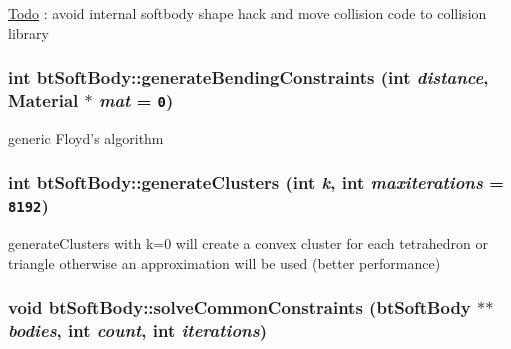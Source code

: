 \begin{Desc}
\item[\hyperlink{todo__todo000039}{Todo}]: avoid internal softbody shape hack and move collision code to collision library \end{Desc}
\hypertarget{classbt_soft_body_f31b03f0ff5eecec1ec9eee5a7582d20}{
\subsubsection[generateBendingConstraints]{\setlength{\rightskip}{0pt plus 5cm}int btSoftBody::generateBendingConstraints (int {\em distance}, \/  Material $\ast$ {\em mat} = {\tt 0})}}
\label{classbt_soft_body_f31b03f0ff5eecec1ec9eee5a7582d20}




generic Floyd's algorithm \hypertarget{classbt_soft_body_9915ca0d99dbeb9f39221dab218d5208}{
\subsubsection[generateClusters]{\setlength{\rightskip}{0pt plus 5cm}int btSoftBody::generateClusters (int {\em k}, \/  int {\em maxiterations} = {\tt 8192})}}
\label{classbt_soft_body_9915ca0d99dbeb9f39221dab218d5208}


generateClusters with k=0 will create a convex cluster for each tetrahedron or triangle otherwise an approximation will be used (better performance) \hypertarget{classbt_soft_body_e8a2fc459b2afc985fbb03c1b0203bec}{
\subsubsection[solveCommonConstraints]{\setlength{\rightskip}{0pt plus 5cm}void btSoftBody::solveCommonConstraints ({\bf btSoftBody} $\ast$$\ast$ {\em bodies}, \/  int {\em count}, \/  int {\em iterations})}}
\label{classbt_soft_body_e8a2fc459b2afc985fbb03c1b0203bec}




